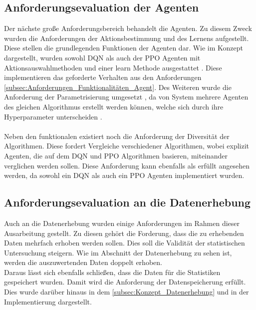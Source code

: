\subsection{Anforderungsevaluation der Agenten}
Der nächste große Anforderungsbereich behandelt die Agenten. Zu diesem Zweck wurden die Anforderungen der Aktionsbestimmung und des Lernens aufgestellt. Diese stellen die grundlegenden Funktionen der Agenten dar. 
Wie im Konzept dargestellt, wurden sowohl DQN als auch der PPO Agenten mit Aktionsauswahlmethoden und einer learn Methode ausgestattet . Diese implementieren das geforderte Verhalten aus den Anforderungen \ref{subsec:Anforderungen_Funktionalitäten_Agent}. Des Weiteren wurde die Anforderung der Parametrisierung umgesetzt , da von System mehrere Agenten des gleichen Algorithmus erstellt werden können, welche sich durch ihre Hyperparameter unterscheiden .\\
\\Neben den funktionalen existiert noch die Anforderung der Diversität der Algorithmen.
Diese fordert Vergleiche verschiedener Algorithmen, wobei explizit Agenten, die auf dem DQN und PPO Algorithmen basieren, miteinander verglichen werden sollen. Diese Anforderung kann ebenfalls als erfüllt angesehen werden, da sowohl ein DQN  als auch ein PPO Agenten  implementiert wurden.

\subsection{Anforderungsevaluation an die Datenerhebung} \label{sec:Evaluation_Datenerhebung}
Auch an die Datenerhebung wurden einige Anforderungen im Rahmen dieser Ausarbeitung gestellt. Zu diesen gehört die Forderung, dass die zu erhebenden Daten mehrfach erhoben werden sollen. Dies soll die Validität der statistischen Untersuchung steigern. Wie im Abschnitt der Datenerhebung  zu sehen ist, werden die auszuwertenden Daten doppelt erhoben.\\
Daraus lässt sich ebenfalls schließen, dass die Daten für die Statistiken gespeichert wurden. Damit wird die Anforderung der Datenspeicherung erfüllt. Dies wurde darüber hinaus in dem \autoref{subsec:Konzept_Datenerhebung} und in der Implementierung  dargestellt.

